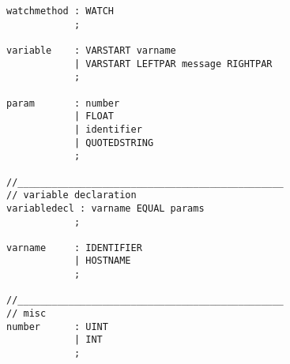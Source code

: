 \begin{verbatim}
watchmethod : WATCH            	
            ;

variable    : VARSTART varname
            | VARSTART LEFTPAR message RIGHTPAR
            ;

param       : number            
            | FLOAT            	
            | identifier		
            | QUOTEDSTRING		
            ;

//_______________________________________________
// variable declaration
variabledecl : varname EQUAL params	
            ;

varname	    : IDENTIFIER            
            | HOSTNAME            	
            ;

//_______________________________________________
// misc
number      : UINT            		
            | INT            		
            ;
\end{verbatim}
